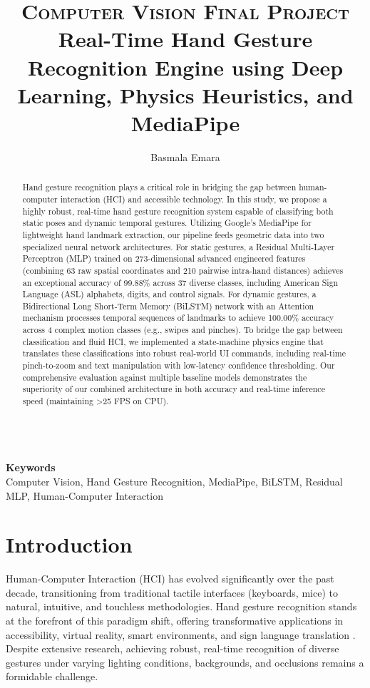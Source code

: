 \documentclass[10pt,twocolumn,letterpaper]{article}
\title{
		\usefont{OT1}{bch}{b}{n}
		\normalfont \normalsize \textsc{Computer Vision Final Project} \\ [10pt]
		\huge Real-Time Hand Gesture Recognition Engine using Deep Learning, Physics Heuristics, and MediaPipe \\
}
\author[1]{Basmala Emara}
\affil[1]{University Name}
\begin{document}
\maketitle

\begin{abstract}
Hand gesture recognition plays a critical role in bridging the gap between human-computer interaction (HCI) and accessible technology. In this study, we propose a highly robust, real-time hand gesture recognition system capable of classifying both static poses and dynamic temporal gestures. Utilizing Google's MediaPipe for lightweight hand landmark extraction, our pipeline feeds geometric data into two specialized neural network architectures. For static gestures, a Residual Multi-Layer Perceptron (MLP) trained on 273-dimensional advanced engineered features (combining 63 raw spatial coordinates and 210 pairwise intra-hand distances) achieves an exceptional accuracy of 99.88\% across 37 diverse classes, including American Sign Language (ASL) alphabets, digits, and control signals. For dynamic gestures, a Bidirectional Long Short-Term Memory (BiLSTM) network with an Attention mechanism processes temporal sequences of landmarks to achieve 100.00\% accuracy across 4 complex motion classes (e.g., swipes and pinches). To bridge the gap between classification and fluid HCI, we implemented a state-machine physics engine that translates these classifications into robust real-world UI commands, including real-time pinch-to-zoom and text manipulation with low-latency confidence thresholding. Our comprehensive evaluation against multiple baseline models demonstrates the superiority of our combined architecture in both accuracy and real-time inference speed (maintaining >25 FPS on CPU).
\end{abstract} 
\\ 
{\textbf{Keywords} \\
Computer Vision, Hand Gesture Recognition, MediaPipe, BiLSTM, Residual MLP, Human-Computer Interaction}

\section{Introduction}

Human-Computer Interaction (HCI) has evolved significantly over the past decade, transitioning from traditional tactile interfaces (keyboards, mice) to natural, intuitive, and touchless methodologies. Hand gesture recognition stands at the forefront of this paradigm shift, offering transformative applications in accessibility, virtual reality, smart environments, and sign language translation \cite{Oudah2020}. Despite extensive research, achieving robust, real-time recognition of diverse gestures under varying lighting conditions, backgrounds, and occlusions remains a formidable challenge.
\end{document}
